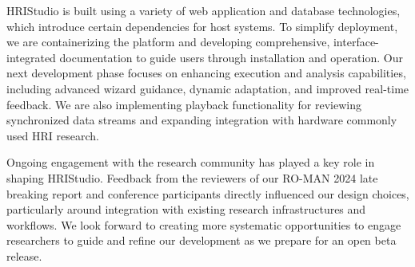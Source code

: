 \documentclass[letterpaper, 10 pt, conference]{subfiles/ieeeconf}
\begin{document}
HRIStudio is built using a variety of web application and database technologies, which introduce certain dependencies for host systems. To simplify deployment, we are containerizing the platform and developing comprehensive, interface-integrated documentation to guide users through installation and operation. Our next development phase focuses on enhancing execution and analysis capabilities, including advanced wizard guidance, dynamic adaptation, and improved real-time feedback. We are also implementing playback functionality for reviewing synchronized data streams and expanding integration with hardware commonly used HRI research.

Ongoing engagement with the research community has played a key role in shaping HRIStudio. Feedback from the reviewers of our RO-MAN 2024 late breaking report and conference participants directly influenced our design choices, particularly around integration with existing research infrastructures and workflows. We look forward to creating more systematic opportunities to engage researchers to guide and refine our development as we prepare for an open beta release.



\end{document}
